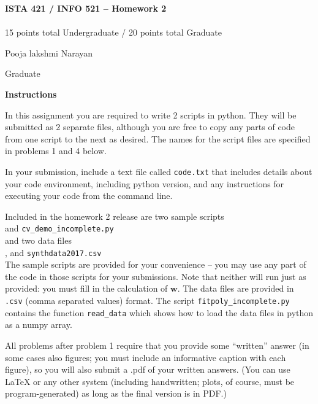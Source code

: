 \documentclass[10pt]{article}
\newcommand{\latex}{\LaTeX\xspace}
\begin{document}
\begin{center}
    {\Large {\bf ISTA 421 / INFO 521 -- Homework 2}} \\
     \\
    15 points total Undergraduate / 20 points total Graduate

\end{center}

\begin{flushright}
Pooja lakshmi Narayan %

Graduate %
\end{flushright}


\vspace{1cm}
{\Large {\bf Instructions}}

In this assignment you are required to write 2 scripts in python.  They will be submitted as 2 separate files, although you are free to copy any parts of code from one script to the next as desired.  The names for the script files are specified in problems 1 and 4 below.

In your submission, include a text file called {\tt code.txt} that includes details about your code environment, including python version, and any instructions for executing your code from the command line.

Included in the homework 2 release are two sample scripts \\ 
\-\hspace{2cm}{\tt fitpoly\_incomplete.py} and {\tt cv\_demo\_incomplete.py} \\
and two data files\\
\-\hspace{2cm}{\tt womens100.csv}, and {\tt synthdata2017.csv}\\
The sample scripts are provided for your convenience -- you may use any part of the code in those scripts for your submissions.  Note that neither will run just as provided: you must fill in the calculation of $\mathbf{w}$.  The data files are provided in {\tt .csv} (comma separated values) format.  The script {\tt fitpoly\_incomplete.py} contains the function {\tt read\_data} which shows how to load the data files in python as a numpy array.

All problems after problem 1 require that you provide some ``written'' answer (in some cases also figures; you must include an informative caption with each figure), so you will also submit a .pdf of your written answers.  (You can use \latex or any other system (including handwritten; plots, of course, must be program-generated) as long as the final version is in PDF.)
\end{document}
